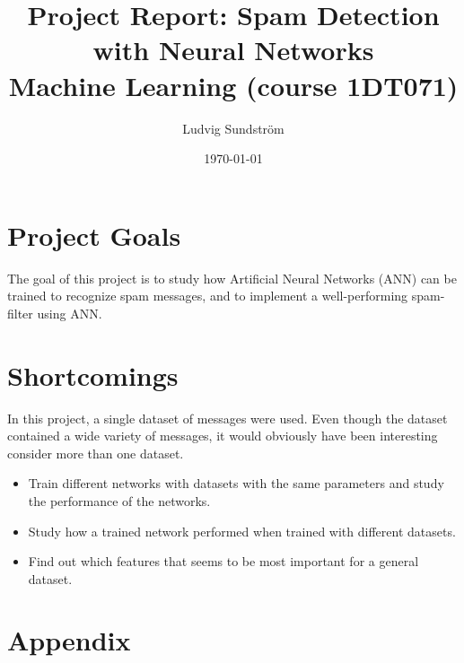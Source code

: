 \documentclass[a4paper,11pt]{article}
\title{\textbf{Project Report: Spam Detection with Neural Networks} \\
    \textbf{Machine Learning (course 1DT071)} \\  
}
\author{Ludvig Sundstr\"{o}m}
\date{\today}
\theoremstyle{definition}
\begin{document}
\maketitle
\newpage
\tableofcontents
\newpage

\section{Project Goals} 
  The goal of this project is to study how Artificial Neural Networks (ANN) can
  be trained to recognize spam messages, and to implement a well-performing
  spam-filter using ANN.







\section{Shortcomings}
  In this project, a single dataset of messages were used. Even though the
  dataset contained a wide variety of messages, it would obviously have been
  interesting consider more than one dataset.  
  \begin{itemize} 
    \item Train different networks with datasets with the same parameters and
      study the performance of the networks.
    \item Study how a trained network performed when trained with different
    datasets.  
    \item Find out which features that seems to be most important
      for a general dataset. 
  \end{itemize} 

\section{Appendix}
\end{document}
